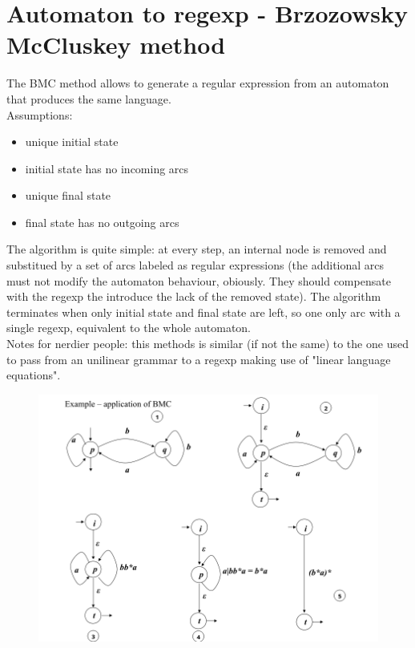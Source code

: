\documentclass[10pt,a4paper]{article}
\begin{document}
		\section{Automaton to regexp - Brzozowsky McCluskey method}
			The BMC method allows to generate a regular expression from an automaton that produces the same language.\\
			Assumptions:
			\begin{itemize}
				\item unique initial state
				\item initial state has no incoming arcs
				\item unique final state
				\item final state has no outgoing arcs
			\end{itemize}
			The algorithm is quite simple: at every step, an internal node is removed and substitued by a set of arcs labeled as regular expressions (the additional arcs must not modify the automaton behaviour, obiously. They should compensate with the regexp the introduce the lack of the removed state). The algorithm terminates when only initial state and final state are left, so one only arc with a single regexp, equivalent to the whole automaton.\\
			Notes for nerdier people: this methods is similar (if not the same) to the one used to pass from an unilinear grammar to a regexp making use of "linear language equations".
			\begin{figure}[htp]
				\begin{center}
				    \includegraphics[width = \textwidth]{./images/BMCMethod.png}
				\end{center}
			\end{figure}
		
\end{document}
